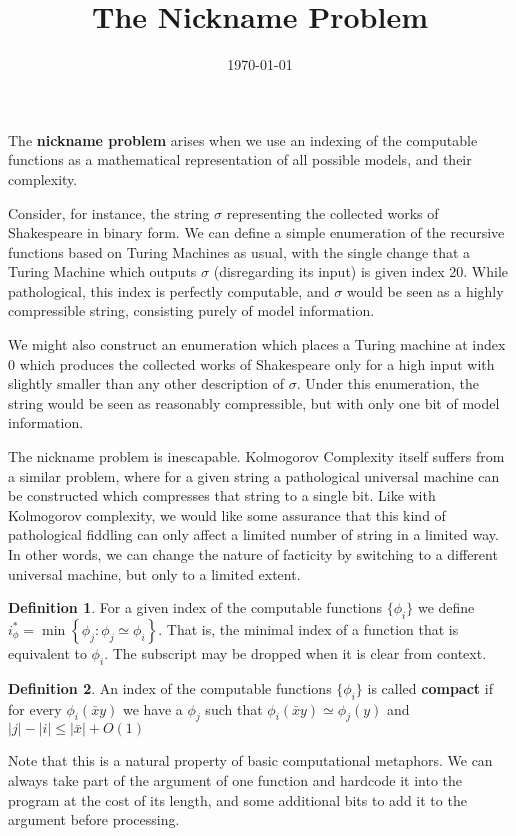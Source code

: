 \documentclass{article}
\title{The Nickname Problem}
\date{\today}
\theoremstyle{definition}
\newtheorem*{dfn}{Definition}
\begin{document}
\maketitle
The \textbf{nickname problem} arises when we use an indexing of the computable functions as a mathematical representation of all possible models, and their complexity. 

Consider, for instance, the string $\sigma$ representing the collected works of Shakespeare in binary form. We can define a simple enumeration of the recursive functions based on Turing Machines as usual, with the single change that a Turing Machine which outputs $\sigma$ (disregarding its input) is given index 20. While pathological, this index is perfectly computable, and $\sigma$ would be seen as a highly compressible string, consisting purely of model information. 

We might also construct an enumeration which places a Turing machine at index 0 which produces the collected works of Shakespeare only for a high input with slightly smaller than any other description of $\sigma$. Under this enumeration, the string would be seen as reasonably compressible, but with only one bit of model information.

The nickname problem is inescapable. Kolmogorov Complexity itself suffers from a similar problem, where for a given string a pathological universal machine can be constructed which compresses that string to a single bit. Like with Kolmogorov complexity, we would like some assurance that this kind of pathological fiddling can only affect a limited number of string in a limited way. In other words, we can change the nature of facticity by switching to a different universal machine, but only to a limited extent.

\begin{dfn}
For a given index of the computable functions $\{\phi_i\}$ we define $i^*_\phi = \min\left\{\phi_j : \phi_j \simeq \phi_i\right\}$. That is, the minimal index of a function that is equivalent to $\phi_i$. The subscript may be dropped when it is clear from context.
\end{dfn}

\begin{dfn}
An index of the computable functions $\{\phi_i\}$ is called \textbf{compact} if for every 
$\phi_i(\bar{x}y)$ we have a $\phi_j$ such that $\phi_i(\bar{x}y) \simeq \phi_j(y)$ and  $|j| - |i| \leq |\bar{x}| + O(1)$
\end{dfn}

Note that this is a natural property of basic computational metaphors. We can always take part of the argument of one function and hardcode it into the program at the cost of its length, and some additional bits to add it to the argument before processing. 
\end{document}
